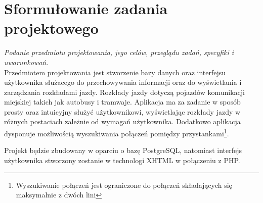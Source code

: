 \section{Sformułowanie zadania projektowego}

\textit{Podanie przedmiotu projektowania, jego celów,
przeglądu zadań, specyfiki i uwarunkowań.} \\

Przedmiotem projektowania jest stworzenie bazy danych oraz interfejsu użytkownika służacego do przechowywania informacji oraz do wyświetlania i zarządzania rozkładami jazdy. Rozkłady jazdy dotyczą pojazdów komunikacji miejskiej takich jak autobusy i tramwaje.
Aplikacja ma za zadanie w sposób prosty oraz intuicyjny służyć użytkownikowi, wyświetlając rozkłady jazdy w różnych postaciach zależnie od wymagań użytkownika. Dodatkowo aplikacja dysponuje możliwością wyszukiwania połączeń pomiędzy przystankami\footnote{Wyszukiwanie połączeń jest ograniczone do połączeń składających się maksymalnie z dwóch lini}.

Projekt będzie zbudowany w oparciu o bazę PostgreSQL, natomiast interfejs użytkownika stworzony zostanie w technologi XHTML w połączeniu z PHP.
